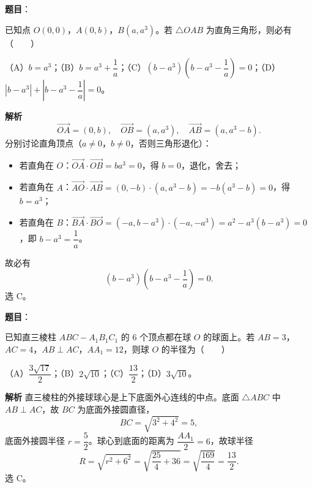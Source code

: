 \begin{answer}

\textbf{题目}：

已知点 $O(0,0)$，$A(0,b)$，$B(a,a^3)$。若 $\triangle OAB$ 为直角三角形，则必有\mbox{（　　）}

（A）$b=a^3$；（B）$b=a^3+\dfrac1a$；（C）$(b-a^3)\left(b-a^3-\dfrac1a\right)=0$；（D）$\left|b-a^3\right|+\left|b-a^3-\dfrac1a\right|=0$。

\textbf{解析}
\nopagebreak[4]
\[\overrightarrow{OA}=(0,b),\quad \overrightarrow{OB}=(a,a^3),\quad \overrightarrow{AB}=(a,a^3-b).\]
分别讨论直角顶点（$a\neq0$，$b\neq0$，否则三角形退化）：

\begin{itemize}
\item 若直角在 $O$：$\overrightarrow{OA}\cdot\overrightarrow{OB}=ba^3=0$，得 $b=0$，退化，舍去；
\item 若直角在 $A$：$\overrightarrow{AO}\cdot\overrightarrow{AB}=(0,-b)\cdot(a,a^3-b)=-b(a^3-b)=0$，得 $b=a^3$；
\item 若直角在 $B$：$\overrightarrow{BA}\cdot\overrightarrow{BO}=(-a,b-a^3)\cdot(-a,-a^3)=a^2-a^3(b-a^3)=0$，即 $b-a^3=\dfrac1a$。
\end{itemize}

故必有
\nopagebreak[4]
\[(b-a^3)\left(b-a^3-\frac1a\right)=0.\]
选 C。


\end{answer}
\begin{answer}

\textbf{题目}：

已知直三棱柱 $ABC-A_1B_1C_1$ 的 $6$ 个顶点都在球 $O$ 的球面上。若 $AB=3$，$AC=4$，$AB\perp AC$，$AA_1=12$，则球 $O$ 的半径为\mbox{（　　）}

（A）$\dfrac{3\sqrt{17}}2$；（B）$2\sqrt{10}$；（C）$\dfrac{13}2$；（D）$3\sqrt{10}$。

\textbf{解析}
直三棱柱的外接球球心是上下底面外心连线的中点。底面 $\triangle ABC$ 中 $AB\perp AC$，故 $BC$ 为底面外接圆直径，
\nopagebreak[4]
\[BC=\sqrt{3^2+4^2}=5,\]
底面外接圆半径 $r=\dfrac52$。球心到底面的距离为 $\dfrac{AA_1}2=6$，故球半径
\nopagebreak[4]
\[R=\sqrt{r^2+6^2}=\sqrt{\frac{25}4+36}=\sqrt{\frac{169}4}=\frac{13}2.\]
选 C。


\end{answer}
